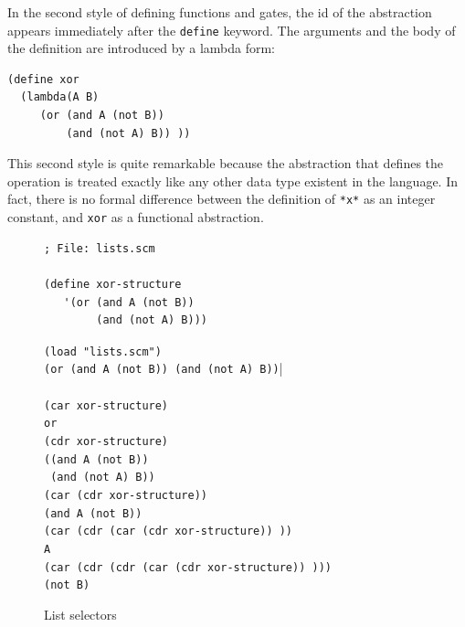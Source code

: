 \documentclass[a4paper,12pt]{book}
\newenvironment{fmpage}[1]
               {\begin{lrbox}{\fmbox}\begin{minipage}{#1}}
               {\end{minipage}\end{lrbox}\fbox{\usebox{\fmbox}}}
\begin{document}
In the second style of defining functions and
gates, the id of the abstraction 
appears immediately after the \verb|define|
keyword. The  arguments and the body of
the definition are introduced by a lambda form:
\label{page:lambda1}

\begin{verbatim}
(define xor
  (lambda(A B)
     (or (and A (not B))
         (and (not A) B)) ))
\end{verbatim}

This second style is quite remarkable because
the abstraction that defines the operation
is treated exactly like any other
data type existent in the language.
In fact, there is no formal difference
between the definition of \verb|*x*|
as an integer constant, and \verb|xor|
as a functional abstraction.

\begin{figure}[!h]
\begin{fmpage}{0.8\linewidth}
\begin{verbatim}
; File: lists.scm

(define xor-structure
   '(or (and A (not B))
        (and (not A) B)))
\end{verbatim}
\end{fmpage}

\begin{fmpage}{0.8\linewidth}
\verb|(load "lists.scm")|\keys{~]~}\\
\verb|(or (and A (not B)) (and (not A) B))||\\
\verb||\\
\verb|(car xor-structure)| \keys{~]~} \\
\verb|or|\\
\verb|(cdr xor-structure)|\keys{~]~}\\
\verb|((and A (not B))|\\
\verb| (and (not A) B))|\\
\verb|(car (cdr xor-structure))|\keys{~]~}\\
\verb|(and A (not B))|\\
\verb|(car (cdr (car (cdr xor-structure)) ))|\keys{~]~}\\
\verb|A|\\
\verb|(car (cdr (cdr (car (cdr xor-structure)) )))|\keys{~]~}\\
\verb|(not B)|
\end{fmpage}

\begin{fmpage}{0.8\linewidth}
\verb||
\end{fmpage}
\caption{List selectors}
\label{fig:selectors}
\end{figure}
\end{document}
